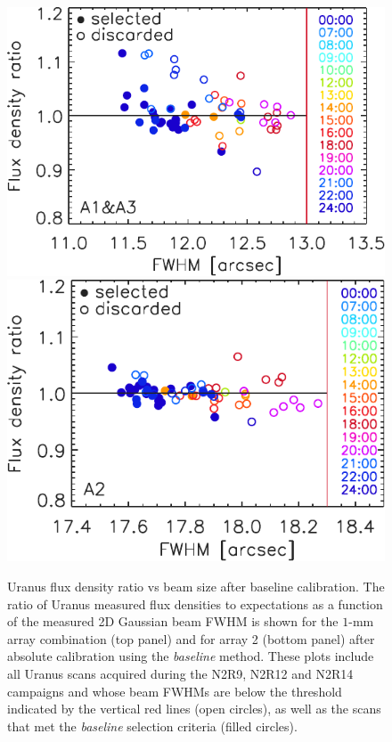 \begin{figure}[!htbp]
\begin{center}
\includegraphics[clip=true, trim={0, -0.3cm, -0.3cm, 0}, width=0.72\linewidth]{Figures/plot_flux_density_ratio_fwhm_uranus_corrected_skydip_narrow_1mm.pdf}
\includegraphics[clip=true, trim={0cm, -0.3cm, -0.6cm, 0}, width=0.707\linewidth]{Figures/plot_flux_density_ratio_fwhm_uranus_corrected_skydip_narrow_a2.pdf}
  
\caption[Uranus flux density stability against FWHM]{ Uranus flux
density ratio vs beam size after baseline calibration. The ratio
of Uranus measured flux densities to expectations as a function of the
measured 2D Gaussian beam FWHM is shown for the $1$-mm array
combination (top panel) and for array 2 (bottom panel) after absolute calibration using the
\emph{baseline} method. These plots include all Uranus scans acquired during the 
N2R9, N2R12 and N2R14 campaigns and whose beam FWHMs are below the threshold indicated
by the vertical red lines (open circles), as well as the scans that
met the \emph{baseline} selection criteria (filled circles).}
\label{fig:calib_uranus_vs_fwhm_all}
\end{center}
\end{figure}

